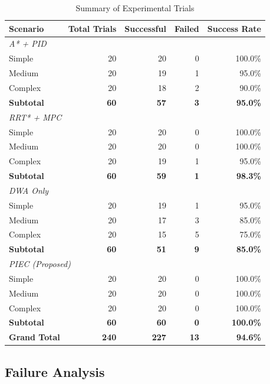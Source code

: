\begin{table}[htbp]
\centering
\caption{Summary of Experimental Trials}
\label{tab:trial_summary}
\begin{tabular}{@{}lrrrr@{}}
\toprule
\textbf{Scenario} & \textbf{Total Trials} & \textbf{Successful} & \textbf{Failed} & \textbf{Success Rate} \\
\midrule
\multicolumn{5}{l}{\textit{A* + PID}} \\
Simple & 20 & 20 & 0 & 100.0\% \\
Medium & 20 & 19 & 1 & 95.0\% \\
Complex & 20 & 18 & 2 & 90.0\% \\
\textbf{Subtotal} & \textbf{60} & \textbf{57} & \textbf{3} & \textbf{95.0\%} \\
\midrule
\multicolumn{5}{l}{\textit{RRT* + MPC}} \\
Simple & 20 & 20 & 0 & 100.0\% \\
Medium & 20 & 20 & 0 & 100.0\% \\
Complex & 20 & 19 & 1 & 95.0\% \\
\textbf{Subtotal} & \textbf{60} & \textbf{59} & \textbf{1} & \textbf{98.3\%} \\
\midrule
\multicolumn{5}{l}{\textit{DWA Only}} \\
Simple & 20 & 19 & 1 & 95.0\% \\
Medium & 20 & 17 & 3 & 85.0\% \\
Complex & 20 & 15 & 5 & 75.0\% \\
\textbf{Subtotal} & \textbf{60} & \textbf{51} & \textbf{9} & \textbf{85.0\%} \\
\midrule
\multicolumn{5}{l}{\textit{PIEC (Proposed)}} \\
Simple & 20 & 20 & 0 & 100.0\% \\
Medium & 20 & 20 & 0 & 100.0\% \\
Complex & 20 & 20 & 0 & 100.0\% \\
\textbf{Subtotal} & \textbf{60} & \textbf{60} & \textbf{0} & \textbf{100.0\%} \\
\midrule
\textbf{Grand Total} & \textbf{240} & \textbf{227} & \textbf{13} & \textbf{94.6\%} \\
\bottomrule
\end{tabular}
\end{table}

\subsection{Failure Analysis}

